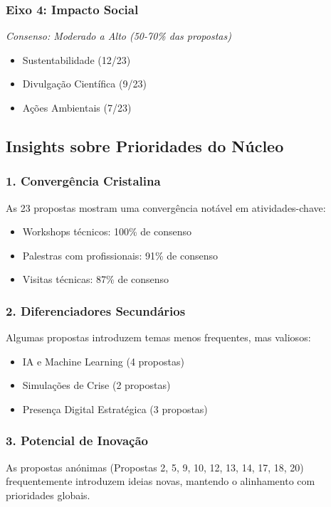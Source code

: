 \documentclass[12pt,a4paper]{article}
\begin{document}
\subsubsection*{Eixo 4: Impacto Social}
\textit{Consenso: Moderado a Alto (50-70\% das propostas)}
\begin{itemize}[itemsep=0.15cm]
    \item[\checkmark] Sustentabilidade (12/23)
    \item[\checkmark] Divulgação Científica (9/23)
    \item[\checkmark] Ações Ambientais (7/23)
\end{itemize}

\newpage

\subsection{Insights sobre Prioridades do Núcleo}

\subsubsection*{1. Convergência Cristalina}
As 23 propostas mostram uma convergência notável em atividades-chave:
\begin{itemize}[itemsep=0.15cm]
    \item Workshops técnicos: 100\% de consenso
    \item Palestras com profissionais: 91\% de consenso
    \item Visitas técnicas: 87\% de consenso
\end{itemize}

\subsubsection*{2. Diferenciadores Secundários}
Algumas propostas introduzem temas menos frequentes, mas valiosos:
\begin{itemize}[itemsep=0.15cm]
    \item IA e Machine Learning (4 propostas)
    \item Simulações de Crise (2 propostas)
    \item Presença Digital Estratégica (3 propostas)
\end{itemize}

\subsubsection*{3. Potencial de Inovação}
As propostas anónimas (Propostas 2, 5, 9, 10, 12, 13, 14, 17, 18, 20) frequentemente introduzem ideias novas, mantendo o alinhamento com prioridades globais.
\end{document}
